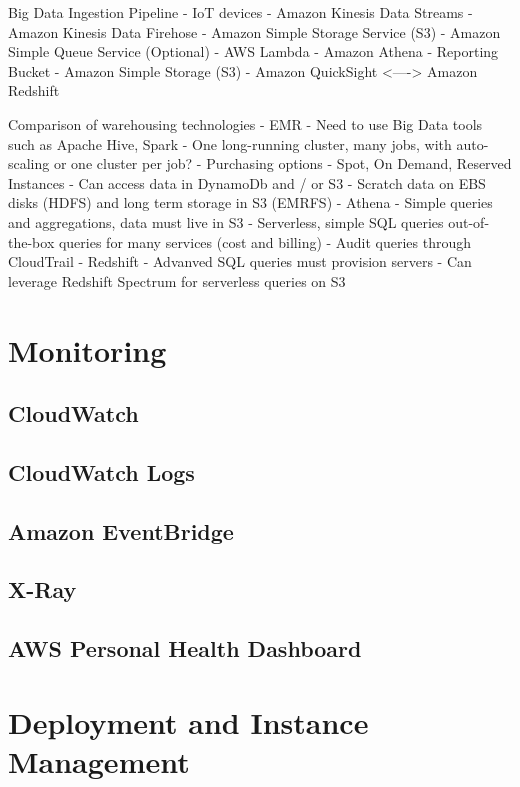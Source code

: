 \documentclass[11pt]{book}
\begin{document}
    Big Data Ingestion Pipeline
    - IoT devices
    - Amazon Kinesis Data Streams
    - Amazon Kinesis Data Firehose
    - Amazon Simple Storage Service (S3)
    - Amazon Simple Queue Service (Optional)
    - AWS Lambda
    - Amazon Athena
    - Reporting Bucket - Amazon Simple Storage (S3)
    - Amazon QuickSight <----> Amazon Redshift

    Comparison of warehousing technologies
    - EMR
        - Need to use Big Data tools such as Apache Hive, Spark
        - One long-running cluster, many jobs, with auto-scaling or one cluster per job?
        - Purchasing options - Spot, On Demand, Reserved Instances
        - Can access data in DynamoDb and / or S3
        - Scratch data on EBS disks (HDFS) and long term storage in S3 (EMRFS)
    - Athena
        - Simple queries and aggregations, data must live in S3
        - Serverless, simple SQL queries out-of-the-box queries for many services (cost and billing)
        - Audit queries through CloudTrail
    - Redshift
        - Advanved SQL queries must provision servers
        - Can leverage Redshift Spectrum for serverless queries on S3

    \chapter{Monitoring}

    \section{CloudWatch}

    \section{CloudWatch Logs}

    \section{Amazon EventBridge}

    \section{X-Ray}

    \section{AWS Personal Health Dashboard}

    \chapter{Deployment and Instance Management}
\end{document}
